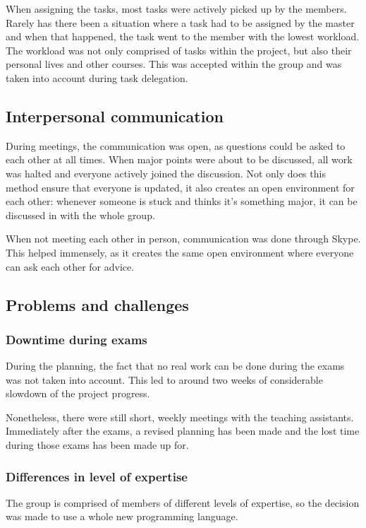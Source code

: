 \documentclass[10pt,a4paper]{report}
\begin{document}
			When assigning the tasks, most tasks were actively picked up by the members. Rarely has there been a situation where a task had to be assigned by the master and when that happened, the task went to the member with the lowest workload. The workload was not only comprised of tasks within the project, but also their personal lives and other courses. This was accepted within the group and was taken into account during task delegation.

		\subsection{Interpersonal communication}
			During meetings, the communication was open, as questions could be asked to each other at all times. When major points were about to be discussed, all work was halted and everyone actively joined the discussion. Not only does this method ensure that everyone is updated, it also creates an open environment for each other: whenever someone is stuck and thinks it's something major, it can be discussed in with the whole group.
			
			When not meeting each other in person, communication was done through Skype. This helped immensely, as it creates the same open environment where everyone can ask each other for advice.

		\subsection{Problems and challenges}
			\subsubsection*{Downtime during exams}
				During the planning, the fact that no real work can be done during the exams was not taken into account. This led to around two weeks of considerable slowdown of the project progress.
				
				Nonetheless, there were still short, weekly meetings with the teaching assistants. Immediately after the exams, a revised planning has been made and the lost time during those exams has been made up for.
			\subsubsection*{Differences in level of expertise}
				The group is comprised of members of different levels of expertise, so the decision was made to use a whole new programming language.
				
\end{document}
